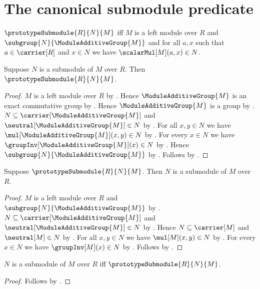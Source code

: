 



\section{The canonical submodule predicate}

\begin{definition}\label{spike_prototype_submodule}
    $\prototypeSubmodule{R}{N}{M}$ iff
        $M$ is a left module over $R$ and
        $\subgroup{N}{\ModuleAdditiveGroup{M}}$ and
        for all $a,x$ such that
            $a\in\carrier[R]$ and $x\in N$ we have
            $\scalarMul[M](a,x)\in N$.
\end{definition}

\begin{proposition}\label{spike_submodule_implies_prototype}
    Suppose $N$ is a submodule of $M$ over $R$.
    Then $\prototypeSubmodule{R}{N}{M}$.
\end{proposition}
\begin{proof}
    $M$ is a left module over $R$ by .
    Hence $\ModuleAdditiveGroup{M}$ is an exact commutative group by
        .
    Hence $\ModuleAdditiveGroup{M}$ is a group by
        .
    $N\subseteq\carrier[\ModuleAdditiveGroup{M}]$ and
        $\neutral[\ModuleAdditiveGroup{M}]\in N$ by
        .
    For all $x,y\in N$ we have
        $\mul[\ModuleAdditiveGroup{M}](x,y)\in N$ by
        .
    For every $x\in N$ we have
        $\groupInv[\ModuleAdditiveGroup{M}](x)\in N$ by
        .
    Hence $\subgroup{N}{\ModuleAdditiveGroup{M}}$ by
        .
    Follows by .
\end{proof}

\begin{proposition}\label{spike_prototype_implies_submodule}
    Suppose $\prototypeSubmodule{R}{N}{M}$.
    Then $N$ is a submodule of $M$ over $R$.
\end{proposition}
\begin{proof}
    $M$ is a left module over $R$ and
        $\subgroup{N}{\ModuleAdditiveGroup{M}}$ by
        .
    $N\subseteq\carrier[\ModuleAdditiveGroup{M}]$ and
        $\neutral[\ModuleAdditiveGroup{M}]\in N$ by
        .
    Hence $N\subseteq\carrier[M]$ and $\neutral[M]\in N$ by
        .
    For all $x,y\in N$ we have
        $\mul[M](x,y)\in N$ by
        .
    For every $x\in N$ we have $\groupInv[M](x)\in N$ by
        .
    Follows by .
\end{proof}

\begin{theorem}\label{spike_submodule_equivalence}
    $N$ is a submodule of $M$ over $R$ iff
        $\prototypeSubmodule{R}{N}{M}$.
\end{theorem}
\begin{proof}
    Follows by
        .
\end{proof}
